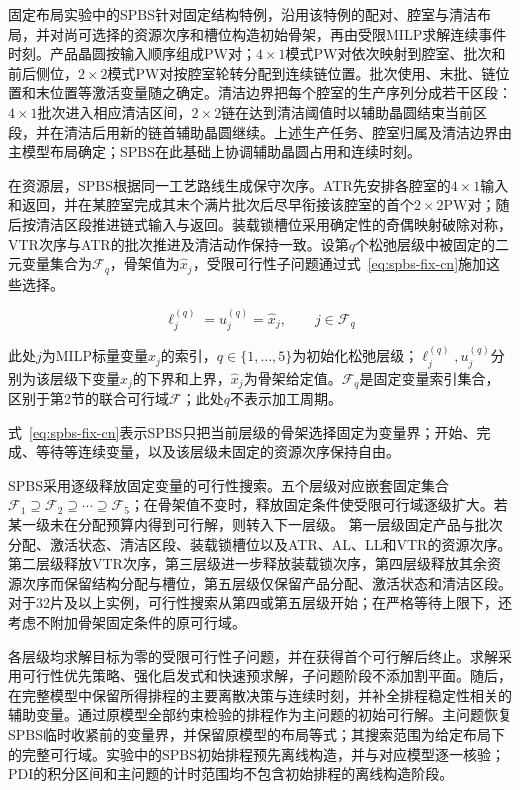 \documentclass[final,5p,times,twocolumn]{elsarticle}
\begin{document}
固定布局实验中的SPBS针对固定结构特例，沿用该特例的配对、腔室与清洁布局，并对尚可选择的资源次序和槽位构造初始骨架，再由受限MILP求解连续事件时刻。产品晶圆按输入顺序组成PW对；$4\times1$模式PW对依次映射到腔室、批次和前后侧位，$2\times2$模式PW对按腔室轮转分配到连续链位置。批次使用、末批、链位置和末位置等激活变量随之确定。清洁边界把每个腔室的生产序列分成若干区段：$4\times1$批次进入相应清洁区间，$2\times2$链在达到清洁阈值时以辅助晶圆结束当前区段，并在清洁后用新的链首辅助晶圆继续。上述生产任务、腔室归属及清洁边界由主模型布局确定；SPBS在此基础上协调辅助晶圆占用和连续时刻。

在资源层，SPBS根据同一工艺路线生成保守次序。ATR先安排各腔室的$4\times1$输入和返回，并在某腔室完成其末个满片批次后尽早衔接该腔室的首个$2\times2$PW对；随后按清洁区段推进链式输入与返回。装载锁槽位采用确定性的奇偶映射破除对称，VTR次序与ATR的批次推进及清洁动作保持一致。设第$q$个松弛层级中被固定的二元变量集合为$\mathcal F_q$，骨架值为$\widehat x_j$，受限可行性子问题通过式~\eqref{eq:spbs-fix-cn}施加这些选择。

\begin{equation}
\ell_j^{(q)}=u_j^{(q)}=\widehat x_j,\qquad j\in\mathcal F_q
\label{eq:spbs-fix-cn}
\end{equation}

此处$j$为MILP标量变量$x_j$的索引，$q\in\{1,\ldots,5\}$为初始化松弛层级；$\ell_j^{(q)},u_j^{(q)}$分别为该层级下变量$x_j$的下界和上界，$\widehat x_j$为骨架给定值。$\mathcal F_q$是固定变量索引集合，区别于第2节的联合可行域$\mathcal F$；此处$q$不表示加工周期。



式~\eqref{eq:spbs-fix-cn}表示SPBS只把当前层级的骨架选择固定为变量界；开始、完成、等待等连续变量，以及该层级未固定的资源次序保持自由。

SPBS采用逐级释放固定变量的可行性搜索。五个层级对应嵌套固定集合$\mathcal F_1\supseteq\mathcal F_2\supseteq\cdots\supseteq\mathcal F_5$；在骨架值不变时，释放固定条件使受限可行域逐级扩大。若某一级未在分配预算内得到可行解，则转入下一层级。
第一层级固定产品与批次分配、激活状态、清洁区段、装载锁槽位以及ATR、AL、LL和VTR的资源次序。第二层级释放VTR次序，第三层级进一步释放装载锁次序，第四层级释放其余资源次序而保留结构分配与槽位，第五层级仅保留产品分配、激活状态和清洁区段。对于32片及以上实例，可行性搜索从第四或第五层级开始；在严格等待上限下，还考虑不附加骨架固定条件的原可行域。

各层级均求解目标为零的受限可行性子问题，并在获得首个可行解后终止。求解采用可行性优先策略、强化启发式和快速预求解，子问题阶段不添加割平面。随后，在完整模型中保留所得排程的主要离散决策与连续时刻，并补全排程稳定性相关的辅助变量。通过原模型全部约束检验的排程作为主问题的初始可行解。主问题恢复SPBS临时收紧前的变量界，并保留原模型的布局等式；其搜索范围为给定布局下的完整可行域。实验中的SPBS初始排程预先离线构造，并与对应模型逐一核验；PDI的积分区间和主问题的计时范围均不包含初始排程的离线构造阶段。
\end{document}
